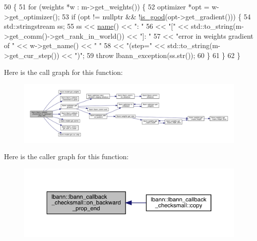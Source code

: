 \begin{DoxyCode}
50                                                              \{
51   \textcolor{keywordflow}{for} (weights *w : m->get\_weights()) \{
52     optimizer *opt = w->get\_optimizer();
53     \textcolor{keywordflow}{if} (opt != \textcolor{keyword}{nullptr} && !\hyperlink{classlbann_1_1lbann__callback__checksmall_afe78f539ba3b2ad3e6ae8c468850052c}{is\_good}(opt->get\_gradient())) \{
54       std::stringstream ss;
55       ss << \hyperlink{classlbann_1_1lbann__callback__checksmall_acbdd897ecbe5a27b59db15ae7662e0f9}{name}() << \textcolor{stringliteral}{": "}
56          << \textcolor{stringliteral}{"["} << std::to\_string(m->get\_comm()->get\_rank\_in\_world()) << \textcolor{stringliteral}{"]: "}
57          << \textcolor{stringliteral}{"error in weights gradient of "} << w->get\_name() << \textcolor{stringliteral}{" "}
58          << \textcolor{stringliteral}{"(step="} << std::to\_string(m->get\_cur\_step()) << \textcolor{stringliteral}{")"};
59       \textcolor{keywordflow}{throw} lbann\_exception(ss.str());
60     \}
61   \}
62 \}
\end{DoxyCode}
Here is the call graph for this function\+:\nopagebreak
\begin{figure}[H]
\begin{center}
\leavevmode
\includegraphics[width=350pt]{classlbann_1_1lbann__callback__checksmall_aade56a328c4b9df28c0cd979eed9e5ff_cgraph}
\end{center}
\end{figure}
Here is the caller graph for this function\+:\nopagebreak
\begin{figure}[H]
\begin{center}
\leavevmode
\includegraphics[width=350pt]{classlbann_1_1lbann__callback__checksmall_aade56a328c4b9df28c0cd979eed9e5ff_icgraph}
\end{center}
\end{figure}
\mbox{\label{classlbann_1_1lbann__callback__checksmall_a00f1e6ad712638a107667a3e6695a6f0}} 
